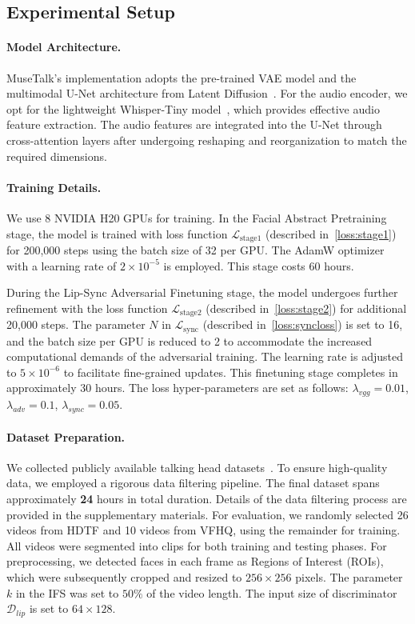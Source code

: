 \subsection{Experimental Setup}
\paragraph{Model Architecture.}
MuseTalk's implementation adopts the pre-trained VAE model and the multimodal U-Net architecture from Latent Diffusion~\cite{rombach2022high}. 
For the audio encoder, we opt for the lightweight Whisper-Tiny model~\cite{radford2023robust}, which provides effective audio feature extraction. The audio features are integrated into the U-Net through cross-attention layers after undergoing reshaping and reorganization to match the required dimensions.

\paragraph{Training Details.}
We use 8 NVIDIA H20 GPUs for training.
In the Facial Abstract Pretraining stage, the model is trained with loss function \(\mathcal{L}_{\text{stage1}}\) (described in~\cref{loss:stage1}) for 200,000 steps using the batch size of 32 per GPU. 
The AdamW optimizer~\cite{loshchilov2017fixing} with a learning rate of \(2 \times 10^{-5}\) is employed. This stage costs 60 hours.

During the Lip-Sync Adversarial Finetuning stage, the model undergoes further refinement with the loss function \(\mathcal{L}_{\text{stage2}}\) (described in~\cref{loss:stage2}) for additional 20,000 steps. 
The parameter \(N\) in \(\mathcal{L}_{\text{sync}}\) (described in~\cref{loss:syncloss}) is set to 16, and the batch size per GPU is reduced to 2 to accommodate the increased computational demands of the adversarial training. The learning rate is adjusted to \(5 \times 10^{-6}\) to facilitate fine-grained updates. This finetuning stage completes in approximately 30 hours.
The loss hyper-parameters are set as follows: $\lambda_{vgg}=0.01$, $\lambda_{adv}=0.1$, $\lambda_{sync}=0.05$.

\paragraph{Dataset Preparation.}
We collected publicly available talking head datasets~\cite{zhang2021flow, xie2022vfhq}. 
To ensure high-quality data, we employed a rigorous data filtering pipeline. 
The final dataset spans approximately \textbf{24} hours in total duration. Details of the data filtering process are provided in the supplementary materials.
For evaluation, we randomly selected 26 videos from HDTF and 10 videos from VFHQ, using the remainder for training. All videos were segmented into clips for both training and testing phases. For preprocessing, we detected faces in each frame as Regions of Interest (ROIs), which were subsequently cropped and resized to \(256 \times 256\) pixels. The parameter \(k\) in the IFS was set to \(50\%\) of the video length.
The input size of discriminator \(\mathcal D_{lip}\) is set to $64\times128$.

